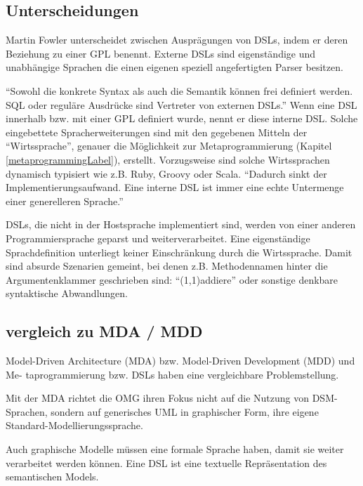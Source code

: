 \documentclass[11pt,english,ngerman, headsepline]{scrreprt}
\begin{document}

 


\subsection{Unterscheidungen}

Martin Fowler unterscheidet zwischen Ausprägungen von DSLs, indem er deren
Beziehung zu einer GPL benennt. Externe DSLs sind eigenständige und unabhängige
Sprachen die einen eigenen speziell angefertigten Parser besitzen. 

``Sowohl die konkrete Syntax als auch die Semantik können frei definiert
werden. SQL oder reguläre Ausdrücke sind Vertreter von externen DSLs.''
\cite{wikidsl} Wenn eine DSL innerhalb bzw.
mit einer GPL definiert wurde, nennt er diese interne DSL. Solche eingebettete
Spracherweiterungen sind mit den gegebenen Mitteln der ``Wirtssprache'',
genauer die Möglichkeit zur Metaprogrammierung (Kapitel
\ref{metaprogrammingLabel}), erstellt.
Vorzugsweise sind solche Wirtssprachen dynamisch typisiert wie z.B. Ruby, Groovy
oder Scala. 
``Dadurch sinkt der Implementierungsaufwand. Eine interne DSL ist immer eine echte
Untermenge einer generelleren Sprache.'' \cite{wikidsl}

DSLs, die nicht in der Hostsprache implementiert sind, werden von einer anderen
Programmiersprache geparst und weiterverarbeitet. Eine eigenständige
Sprachdefinition unterliegt keiner Einschränkung durch die Wirtssprache.
Damit sind absurde Szenarien gemeint, bei denen z.B. Methodennamen hinter die
Argumentenklammer geschrieben sind: ``(1,1)addiere'' oder sonstige denkbare
syntaktische Abwandlungen.


\subsection{vergleich zu MDA / MDD } 

Model-Driven Architecture (MDA) bzw. Model-Driven Development (MDD) und Me-
taprogrammierung bzw. DSLs haben eine vergleichbare Problemstellung.

Mit der MDA richtet die OMG ihren Fokus nicht auf die Nutzung
von DSM-Sprachen, sondern auf generisches UML in graphischer Form,
ihre eigene Standard-Modellierungssprache.

Auch graphische Modelle müssen eine formale Sprache haben, damit sie weiter 
verarbeitet werden können.  Eine DSL ist eine textuelle Repräsentation des 
semantischen Models.
 
\end{document}
